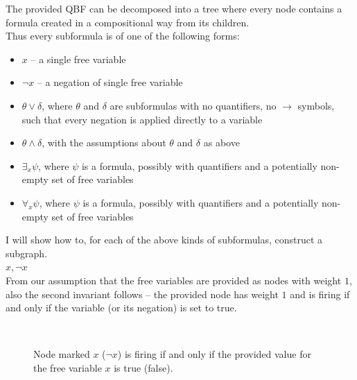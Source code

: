 The provided QBF can be decomposed into a tree where every node contains a formula created in a compositional
way from its children.\\
Thus every subformula is of one of the following forms:
\begin{itemize}
      \item $x$ -- a single free variable
      \item $\lnot x$ -- a negation of single free variable
      \item $\theta \lor \delta$, where $\theta$ and $\delta$ are subformulas with no quantifiers, no $\rightarrow$ symbols,
            such that every negation is applied directly to a variable
      \item $\theta \land \delta$, with the assumptions about $\theta$ and $\delta$ as above
      \item $\exists_{x} \psi$, where $\psi$ is a formula, possibly with quantifiers and a potentially non-empty set of
            free variables
      \item $\forall_{x} \psi$, where $\psi$ is a formula, possibly with quantifiers and a potentially non-empty set of
            free variables
\end{itemize}
I will show how to, for each of the above kinds of subformulas, construct a subgraph.\\

\noindent
\underline{$x, \lnot x$}\\
From our assumption that the free variables are provided as nodes with weight $1$,
also the second invariant follows -- the provided node has weight $1$ and is firing
if and only if the variable (or its negation) is set to true.
\begin{figure}[H]
      \centering
      \caption{Node marked $x$ ($\lnot x$) is firing if and only if the provided value for the free variable $x$ is true (false).}
      \\
\end{figure}

